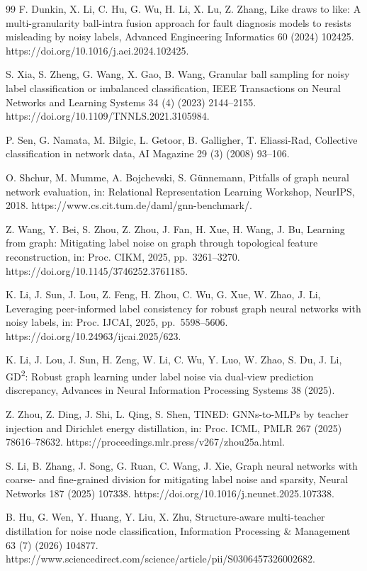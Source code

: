 \begin{thebibliography}{99}
F. Dunkin, X. Li, C. Hu, G. Wu, H. Li, X. Lu, Z. Zhang, Like draws to like: A multi-granularity ball-intra fusion approach for fault diagnosis models to resists misleading by noisy labels, Advanced Engineering Informatics 60 (2024) 102425. https://doi.org/10.1016/j.aei.2024.102425.

S. Xia, S. Zheng, G. Wang, X. Gao, B. Wang, Granular ball sampling for noisy label classification or imbalanced classification, IEEE Transactions on Neural Networks and Learning Systems 34 (4) (2023) 2144--2155. https://doi.org/10.1109/TNNLS.2021.3105984.

P. Sen, G. Namata, M. Bilgic, L. Getoor, B. Galligher, T. Eliassi-Rad, Collective classification in network data, AI Magazine 29 (3) (2008) 93--106.

O. Shchur, M. Mumme, A. Bojchevski, S. G\"{u}nnemann, Pitfalls of graph neural network evaluation, in: Relational Representation Learning Workshop, NeurIPS, 2018. https://www.cs.cit.tum.de/daml/gnn-benchmark/.

Z. Wang, Y. Bei, S. Zhou, Z. Zhou, J. Fan, H. Xue, H. Wang, J. Bu, Learning from graph: Mitigating label noise on graph through topological feature reconstruction, in: Proc. CIKM, 2025, pp.~3261--3270. https://doi.org/10.1145/3746252.3761185.

K. Li, J. Sun, J. Lou, Z. Feng, H. Zhou, C. Wu, G. Xue, W. Zhao, J. Li, Leveraging peer-informed label consistency for robust graph neural networks with noisy labels, in: Proc. IJCAI, 2025, pp.~5598--5606. https://doi.org/10.24963/ijcai.2025/623.

K. Li, J. Lou, J. Sun, H. Zeng, W. Li, C. Wu, Y. Luo, W. Zhao, S. Du, J. Li, GD\textsuperscript{2}: Robust graph learning under label noise via dual-view prediction discrepancy, Advances in Neural Information Processing Systems 38 (2025).

Z. Zhou, Z. Ding, J. Shi, L. Qing, S. Shen, TINED: GNNs-to-MLPs by teacher injection and Dirichlet energy distillation, in: Proc. ICML, PMLR 267 (2025) 78616--78632. https://proceedings.mlr.press/v267/zhou25a.html.

S. Li, B. Zhang, J. Song, G. Ruan, C. Wang, J. Xie, Graph neural networks with coarse- and fine-grained division for mitigating label noise and sparsity, Neural Networks 187 (2025) 107338. https://doi.org/10.1016/j.neunet.2025.107338.

B. Hu, G. Wen, Y. Huang, Y. Liu, X. Zhu, Structure-aware multi-teacher distillation for noise node classification, Information Processing \& Management 63 (7) (2026) 104877. https://www.sciencedirect.com/science/article/pii/S0306457326002682.


\end{thebibliography}
